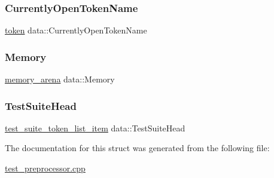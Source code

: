\subsubsection{\texorpdfstring{Currently\+Open\+Token\+Name}{CurrentlyOpenTokenName}}
{\footnotesize\ttfamily \hyperlink{structtoken}{token} data\+::\+Currently\+Open\+Token\+Name}

\mbox{\label{structdata_ad3188e5c8551b604c9d2c3ddbf29a9b8}} 
\subsubsection{\texorpdfstring{Memory}{Memory}}
{\footnotesize\ttfamily \hyperlink{structmemory__arena}{memory\+\_\+arena} data\+::\+Memory}

\mbox{\label{structdata_a5bb01b3754cb4b3baf9b7f499022cd1e}} 
\subsubsection{\texorpdfstring{Test\+Suite\+Head}{TestSuiteHead}}
{\footnotesize\ttfamily \hyperlink{structtest__suite__token__list__item}{test\+\_\+suite\+\_\+token\+\_\+list\+\_\+item} data\+::\+Test\+Suite\+Head}



The documentation for this struct was generated from the following file\+:\begin{DoxyCompactItemize}
\item 
\hyperlink{test__preprocessor_8cpp}{test\+\_\+preprocessor.\+cpp}\end{DoxyCompactItemize}
